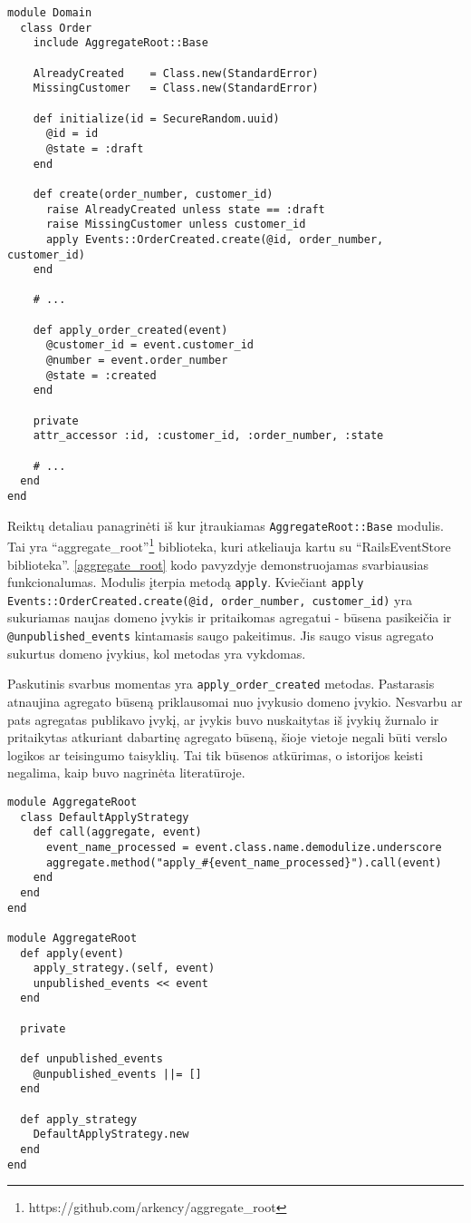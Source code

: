 \begin{lstlisting}[caption=Įvykių pritaikymas domeno objektui, label=apply_domain_events]
module Domain
  class Order
    include AggregateRoot::Base

    AlreadyCreated    = Class.new(StandardError)
    MissingCustomer   = Class.new(StandardError)

    def initialize(id = SecureRandom.uuid)
      @id = id
      @state = :draft
    end

    def create(order_number, customer_id)
      raise AlreadyCreated unless state == :draft
      raise MissingCustomer unless customer_id
      apply Events::OrderCreated.create(@id, order_number, customer_id)
    end

    # ...

    def apply_order_created(event)
      @customer_id = event.customer_id
      @number = event.order_number
      @state = :created
    end

    private
    attr_accessor :id, :customer_id, :order_number, :state

    # ...
  end
end
\end{lstlisting}

Reiktų detaliau panagrinėti iš kur įtraukiamas \lstinline|AggregateRoot::Base| modulis. Tai yra ``aggregate\_root''\footnote{https://github.com/arkency/aggregate\_root} biblioteka, kuri atkeliauja kartu su ``RailsEventStore biblioteka''. \ref{aggregate_root} kodo pavyzdyje demonstruojamas svarbiausias funkcionalumas. Modulis įterpia metodą \lstinline|apply|. Kviečiant \lstinline{apply Events::OrderCreated.create(@id, order_number, customer_id)} yra sukuriamas naujas domeno įvykis ir pritaikomas agregatui - būsena pasikeičia ir \lstinline|@unpublished_events| kintamasis saugo pakeitimus. Jis saugo visus agregato sukurtus domeno įvykius, kol metodas yra vykdomas.

Paskutinis svarbus momentas yra \lstinline|apply_order_created| metodas. Pastarasis atnaujina agregato būseną priklausomai nuo įvykusio domeno įvykio. Nesvarbu ar pats agregatas publikavo įvykį, ar įvykis buvo nuskaitytas iš įvykių žurnalo ir pritaikytas atkuriant dabartinę agregato būseną, šioje vietoje negali būti verslo logikos ar teisingumo taisyklių. Tai tik būsenos atkūrimas, o istorijos keisti negalima, kaip buvo nagrinėta literatūroje.

\begin{lstlisting}[caption=``AggregateRoot'' modulis, label=aggregate_root]
module AggregateRoot
  class DefaultApplyStrategy
    def call(aggregate, event)
      event_name_processed = event.class.name.demodulize.underscore
      aggregate.method("apply_#{event_name_processed}").call(event)
    end
  end
end

module AggregateRoot
  def apply(event)
    apply_strategy.(self, event)
    unpublished_events << event
  end

  private

  def unpublished_events
    @unpublished_events ||= []
  end

  def apply_strategy
    DefaultApplyStrategy.new
  end
end
\end{lstlisting}

